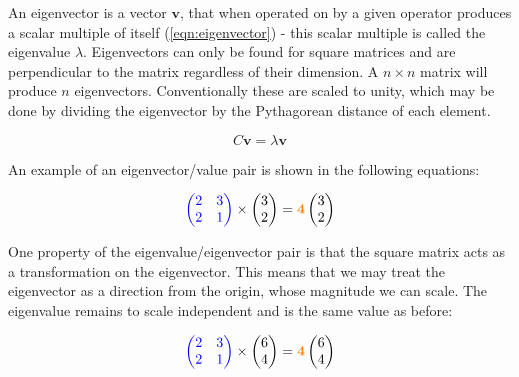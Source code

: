   An eigenvector is a vector $\textbf{v}$, that when operated on by a given operator produces a scalar multiple of itself (\autoref{eqn:eigenvector}) - this scalar multiple is called the eigenvalue $\lambda$. Eigenvectors can only be found for square matrices and are perpendicular to the matrix regardless of their dimension. A $n \times n$ matrix will produce $n$ eigenvectors. Conventionally these are scaled to unity, which may be done by dividing the eigenvector by the Pythagorean distance of each element.

  \begin{equation}
      C\textbf{v} = \lambda\textbf{v}
      \label{eqn:eigenvector}
  \end{equation}

  An example of an eigenvector/value pair is shown in the following equations:

  \begin{equation}
   \textcolor{blue}{
    \begin{pmatrix}
      2 & 3 \\
      2 & 1
    \end{pmatrix}
    }
    \times
    \begin{pmatrix}
      3 \\ 2
    \end{pmatrix}
    =
     \textcolor{orange}{\textbf{4}}
     \begin{pmatrix}
      3 \\ 2
    \end{pmatrix}
  \end{equation}

  One property of the eigenvalue/eigenvector pair is that the square matrix acts as a transformation on the eigenvector. This means that we may treat the eigenvector as a direction from the origin, whose magnitude we can scale. The eigenvalue  remains to scale independent and is the same value as before:

  \begin{equation}
   \textcolor{blue}{
    \begin{pmatrix}
      2 & 3 \\
      2 & 1
    \end{pmatrix}
    }
    \times
    \begin{pmatrix}
      6 \\ 4
    \end{pmatrix}
    =
    \textcolor{orange}{\textbf{4}}
     \begin{pmatrix}
      6 \\ 4
    \end{pmatrix}
  \end{equation}

